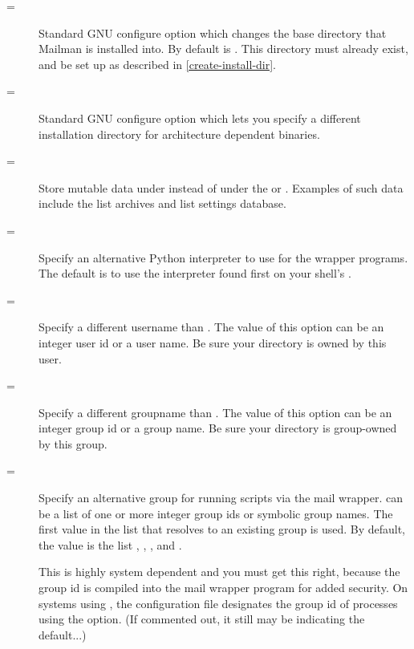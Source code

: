 \documentclass{howto}
\begin{document}
\begin{description}
\item[=]
    Standard GNU configure option which changes the base directory that
    Mailman is installed into.  By default  is
    .  This directory must already exist, and be set
    up as described in \ref{create-install-dir}.

\item[=]
    Standard GNU configure option which lets you specify a different
    installation directory for architecture dependent binaries.

\item[=]
    Store mutable data under  instead of under the  or
    .  Examples of such data include the list archives and
    list settings database.

\item[=]
    Specify an alternative Python interpreter to use for the wrapper programs.
    The default is to use the interpreter found first on your shell's
    .

\item[=]
    Specify a different username than .  The value of this
    option can be an integer user id or a user name.  Be sure your
     directory is owned by this user.

\item[=]
    Specify a different groupname than .  The value of this
    option can be an integer group id or a group name.  Be sure your
     directory is group-owned by this group.

\item[=]
    Specify an alternative group for running scripts via the mail wrapper.
     can be a list of one or more integer group ids or
    symbolic group names.  The first value in the list that resolves to an
    existing group is used.  By default, the value is the list ,
    , , and .

    \begin{notice}[note]
    This is highly system dependent and you must get this right, because the
    group id is compiled into the mail wrapper program for added security.  On
    systems using , the  configuration
    file designates the group id of  processes using the
     option.  (If commented out, it still may be indicating
    the default...)
    \end{notice}


\end{description}
\end{document}
